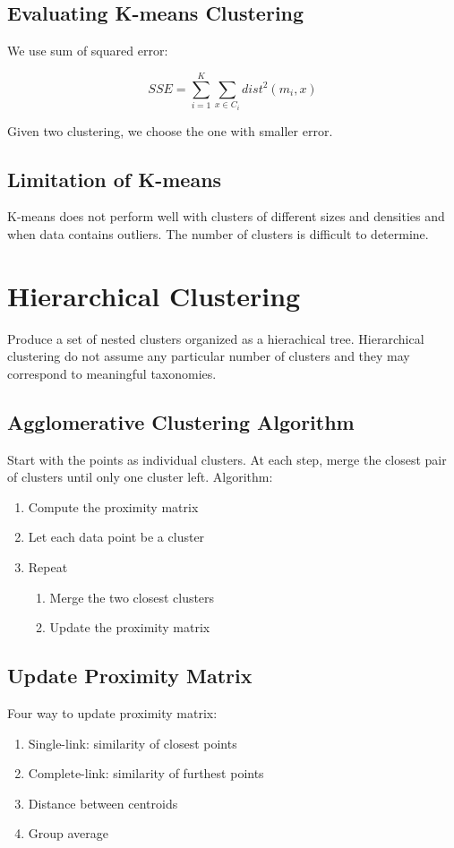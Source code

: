 \begin{multicols}{2}
\subsection{Evaluating K-means Clustering}

\noindent We use sum of squared error:

$$SSE=\sum_{i=1}^K \sum_{x \in C_i} dist^2 (m_i,x)$$

\noindent Given two clustering, we choose the one with smaller error.

\subsection{Limitation of K-means}

K-means does not perform well with clusters of different sizes and densities and when data contains outliers. The number of clusters is difficult to determine. 

\section{Hierarchical Clustering}

\noindent Produce a set of nested clusters organized as a hierachical tree. Hierarchical clustering do not assume any particular number of clusters and they may correspond to meaningful taxonomies. 

\subsection{Agglomerative Clustering Algorithm}

\noindent Start with the points as individual clusters. At each step, merge the closest pair of clusters until only one cluster left. Algorithm:
\begin{enumerate}
    \item Compute the proximity matrix
    \item Let each data point be a cluster
    \item Repeat
    \begin{enumerate}
        \item Merge the two closest clusters
        \item Update the proximity matrix
    \end{enumerate}
\end{enumerate}

\subsection{Update Proximity Matrix}
\noindent Four way to update proximity matrix:
\begin{enumerate}
    \item Single-link: similarity of closest points
    \item Complete-link: similarity of furthest points
    \item Distance between centroids
    \item Group average
\end{enumerate}


\end{multicols}
